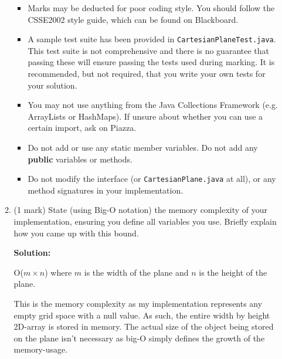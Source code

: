 \documentclass[a4,13pt]{extarticle}
\newenvironment{Solution}{\color{blue}\textbf{Solution:}}{}
\begin{document}
\begin{enumerate}
\begin{enumerate}
\begin{itemize}
	      	      	\item Marks may be deducted for poor coding style. You should follow the CSSE2002 style guide, which can be found on Blackboard.
	      	      	      	      	      	                          
	      	      	\item  A sample test suite has been provided in \texttt{CartesianPlaneTest.java}. 
	      	      	      This test suite is not comprehensive and there is no guarantee that passing these will ensure passing 
	      	      	      the tests used during marking. It is recommended, but not required, that you write your own tests for your solution.
	      	      	      	      	    
	      	      	      	   	                          
	      	      	\item You may not use anything from the Java Collections Framework (e.g. ArrayLists or HashMaps). If unsure about whether you can use a certain import, ask on Piazza.
	      	      	                               
	      	      	\item Do not add or use any static member variables. Do not add any \textbf{public} variables or methods.
	      	      	\item Do not modify the interface (or \texttt{CartesianPlane.java} at all), or any method signatures in your implementation.
	      	      \end{itemize}
	      	      	      	                      
	      	\item (1 mark) State (using Big-O notation) the memory complexity of your implementation, 
	      	      ensuring you define all variables you use. Briefly explain how you came up with this bound.
	      	      
			\begin{Solution}
				
				O($m \times n$) where $m$ is the width of the plane and $n$ is the height of the plane.

				This is the memory complexity as my implementation represents any empty grid space with a null value. As such, the entire width by height 2D-array is stored in memory. The actual size of the object being stored on the plane isn't necessary as big-O simply defines the growth of the memory-usage.
	      	\end{Solution}
	      	      	      	                      

\end{enumerate}
\end{enumerate}
\end{document}
